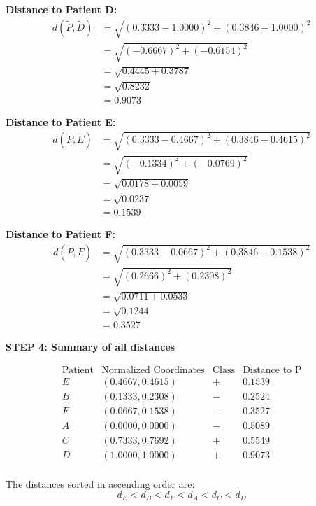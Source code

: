 \documentclass[12pt]{article}
\begin{document}
\begin{solution}
\textbf{Distance to Patient D:}
\begin{align*}
d(\tilde{P}, \tilde{D}) &= \sqrt{(0.3333 - 1.0000)^2 + (0.3846 - 1.0000)^2} \\
&= \sqrt{(-0.6667)^2 + (-0.6154)^2} \\
&= \sqrt{0.4445 + 0.3787} \\
&= \sqrt{0.8232} \\
&= \boxed{0.9073}
\end{align*}

\textbf{Distance to Patient E:}
\begin{align*}
d(\tilde{P}, \tilde{E}) &= \sqrt{(0.3333 - 0.4667)^2 + (0.3846 - 0.4615)^2} \\
&= \sqrt{(-0.1334)^2 + (-0.0769)^2} \\
&= \sqrt{0.0178 + 0.0059} \\
&= \sqrt{0.0237} \\
&= \boxed{0.1539}
\end{align*}

\textbf{Distance to Patient F:}
\begin{align*}
d(\tilde{P}, \tilde{F}) &= \sqrt{(0.3333 - 0.0667)^2 + (0.3846 - 0.1538)^2} \\
&= \sqrt{(0.2666)^2 + (0.2308)^2} \\
&= \sqrt{0.0711 + 0.0533} \\
&= \sqrt{0.1244} \\
&= \boxed{0.3527}
\end{align*}

\textbf{STEP 4: Summary of all distances}

\[
\begin{array}{c|c|c|c}
\text{Patient} & \text{Normalized Coordinates} & \text{Class} & \text{Distance to P} \\
\hline
E & (0.4667, 0.4615) & + & 0.1539 \\
B & (0.1333, 0.2308) & - & 0.2524 \\
F & (0.0667, 0.1538) & - & 0.3527 \\
A & (0.0000, 0.0000) & - & 0.5089 \\
C & (0.7333, 0.7692) & + & 0.5549 \\
D & (1.0000, 1.0000) & + & 0.9073 \\
\end{array}
\]

The distances sorted in ascending order are:
\[
d_E < d_B < d_F < d_A < d_C < d_D
\]
\end{solution}
\end{document}
